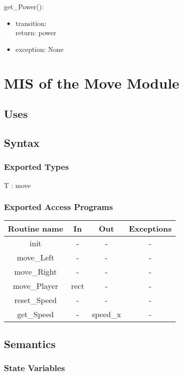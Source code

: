 \documentclass[12pt, titlepage]{article}
\begin{document}
\noindent get\_Power(): 
\begin{itemize}
\item transition:\\
return: power\\
\item exception: None
\end{itemize}

\section {MIS of the Move Module}

\subsection {Uses}

\subsection {Syntax}

\subsubsection {Exported Types}
T : move
\subsubsection {Exported Access Programs}

\begin{tabular}{| c | c | c | c |}
\hline
\textbf{Routine name} & \textbf{In} & \textbf{Out} & \textbf{Exceptions}\\
\hline
init & - & - & -  \\
\hline
move\_Left & - & - & -\\
\hline
move\_Right & - & - & -\\
\hline 
move\_Player & rect & - & -\\
\hline
reset\_Speed & - & - & -\\
\hline
get\_Speed & - & speed\_x & -\\
\hline
\end{tabular}

\subsection {Semantics}

\subsubsection {State Variables}
\end{document}
